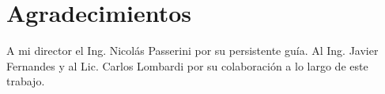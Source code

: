
\section{Agradecimientos}

A mi director el Ing. Nicolás Passerini por su persistente guía. Al Ing. Javier Fernandes y al Lic. 
Carlos Lombardi por su colaboración a lo largo de este trabajo. 
